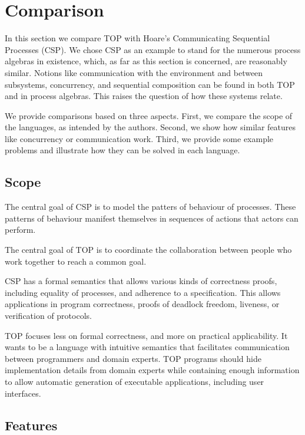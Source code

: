 
\section{Comparison}

In this section we compare TOP with Hoare's Communicating Sequential Processes (CSP).
We chose CSP as an example to stand for the numerous process algebras in existence, which, as far as this section is concerned, are reasonably similar.
Notions like communication with the environment and between subsystems, concurrency, and sequential composition can be found in both TOP and in process algebras.
This raises the question of how these systems relate.

We provide comparisons based on three aspects.
First, we compare the scope of the languages, as intended by the authors.
Second, we show how similar features like concurrency or communication work.
Third, we provide some example problems and illustrate how they can be solved in each language.

\subsection{Scope}

The central goal of CSP is to model the patters of behaviour of processes.
These patterns of behaviour manifest themselves in sequences of actions that actors can perform.

The central goal of TOP is to coordinate the collaboration between people who work together to reach a common goal.

CSP has a formal semantics that allows various kinds of correctness proofs, including equality of processes, and adherence to a specification.
This allows applications in program correctness, proofs of deadlock freedom, liveness, or verification of protocols.

TOP focuses less on formal correctness, and more on practical applicability.
It wants to be a language with intuitive semantics that facilitates communication between programmers and domain experts.
TOP programs should hide implementation details from domain experts while containing enough information to allow automatic generation of executable applications, including user interfaces.

\subsection{Features}

